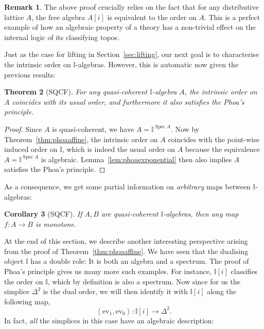 \documentclass[12pt]{amsart}
\newtheorem{theorem}{Theorem}[section]
\newtheorem{corollary}[theorem]{Corollary}
\theoremstyle{definition}
\newtheorem{remark}[theorem]{Remark}
\newcommand{\mbb}[1]{\mathbb{#1}}
\newcommand{\I}{\mbb I}
\newcommand{\pair}[1]{\left\langle#1\right\rangle}
\newcommand{\ev}{\mathrm{ev}}
\newcommand{\spec}{\operatorname{Spec}}
\begin{document}
\begin{remark}
  The above proof crucially relies on the fact that for any distributive lattice $A$, the free algebra $A[i]$ is equivalent to the order on $A$. This is a perfect example of how an algebraic property of a theory has a non-trivial effect on the internal logic of its classifying topos.
\end{remark}

Just as the case for lifting in Section~\ref{sec:lifting}, our next goal is to characterise the intrinsic order on $\I$-algebras. However, this is automatic now given the previous results:

\begin{theorem}[SQCF]\label{them:phoaalgebra}
  For any quasi-coherent $\I$-algebra $A$, the intrinsic order on $A$ coincides with its usual order, and furthermore it also satisfies the Phoa's principle.
\end{theorem}
\begin{proof}
  Since $A$ is quasi-coherent, we have $A = \I^{\spec A}$. Now by Theorem~\ref{thm:phoaaffine}, the intrinsic order on $A$ coincides with the point-wise induced order on $\I$, which is indeed the usual order on $A$ because the equivalence $A = \I^{\spec A}$ is algebraic. Lemma~\ref{lem:phoaexponential} then also implies $A$ satisfies the Phoa's principle.
\end{proof}

As a consequence, we get some partial information on \emph{arbitrary} maps between $\I$-algebras:

\begin{corollary}[SQCF]
  If $A,B$ are quasi-coherent $\I$-algebras, then any map $f : A \to B$ is monotone.
\end{corollary}

At the end of this section, we describe another interesting perspective arising from the proof of Theorem~\ref{thm:phoaaffine}. We have seen that the dualising object $\I$ has a double role: It is both an algebra and a spectrum. The proof of Phoa's principle gives us many more such examples. For instance, $\I[i]$ classifies the order on $\I$, which by definition is also a spectrum. Now since for us the simplice $\Delta^2$ is the dual order, we will then identify it with $\I[i]$ along the following map,
\[ \pair{\ev_1,\ev_0} : \I[i] \to \Delta^2. \]
In fact, \emph{all} the simplices in this case have an algebraic description:
\end{document}
